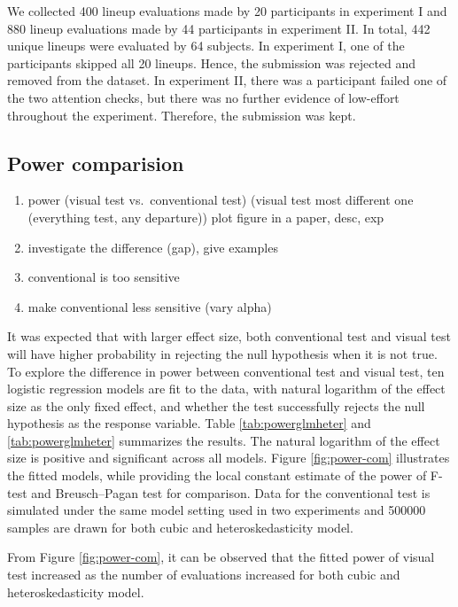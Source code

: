 \documentclass[]{interact}
\theoremstyle{plain}%
\theoremstyle{definition}
\theoremstyle{remark}
\def\tightlist{}
\begin{document}
We collected 400 lineup evaluations made by 20 participants in
experiment I and 880 lineup evaluations made by 44 participants in
experiment II. In total, 442 unique lineups were evaluated by 64
subjects. In experiment I, one of the participants skipped all 20
lineups. Hence, the submission was rejected and removed from the
dataset. In experiment II, there was a participant failed one of the two
attention checks, but there was no further evidence of low-effort
throughout the experiment. Therefore, the submission was kept.

\hypertarget{power-comparision}{%
\subsection{Power comparision}\label{power-comparision}}

\begin{enumerate}
\def\labelenumi{\arabic{enumi}.}
\tightlist
\item
  power (visual test vs.~conventional test) (visual test most different
  one (everything test, any departure)) plot figure in a paper, desc,
  exp
\item
  investigate the difference (gap), give examples
\item
  conventional is too sensitive
\item
  make conventional less sensitive (vary alpha)
\end{enumerate}

It was expected that with larger effect size, both conventional test and
visual test will have higher probability in rejecting the null
hypothesis when it is not true. To explore the difference in power
between conventional test and visual test, ten logistic regression
models are fit to the data, with natural logarithm of the effect size as
the only fixed effect, and whether the test successfully rejects the
null hypothesis as the response variable. Table \ref{tab:powerglmheter}
and \ref{tab:powerglmheter} summarizes the results. The natural
logarithm of the effect size is positive and significant across all
models. Figure \ref{fig:power-com} illustrates the fitted models, while
providing the local constant estimate of the power of F-test and
Breusch--Pagan test for comparison. Data for the conventional test is
simulated under the same model setting used in two experiments and
500000 samples are drawn for both cubic and heteroskedasticity model.

From Figure \ref{fig:power-com}, it can be observed that the fitted
power of visual test increased as the number of evaluations increased
for both cubic and heteroskedasticity model.
\end{document}
